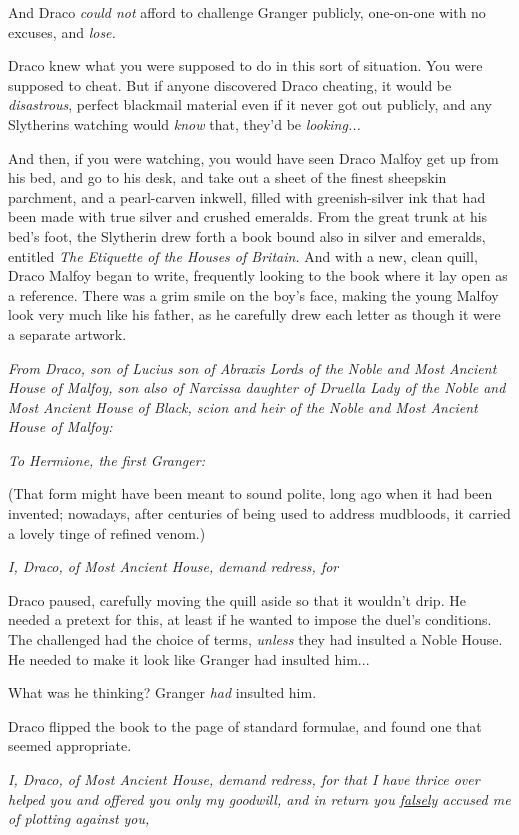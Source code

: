 And Draco \emph{could not} afford to challenge Granger publicly,
one-on-one with no excuses, and \emph{lose.}

Draco knew what you were supposed to do in this sort of
situation. You were supposed to cheat. But if anyone discovered
Draco cheating, it would be \emph{disastrous}, perfect blackmail
material even if it never got out publicly, and any Slytherins
watching would \emph{know} that, they’d be \emph{looking...}

And then, if you were watching, you would have seen Draco Malfoy
get up from his bed, and go to his desk, and take out a sheet of
the finest sheepskin parchment, and a pearl-carven inkwell, filled
with greenish-silver ink that had been made with true silver and
crushed emeralds. From the great trunk at his bed’s foot, the
Slytherin drew forth a book bound also in silver and emeralds,
entitled \emph{The Etiquette of the Houses of Britain.} And with a
new, clean quill, Draco Malfoy began to write, frequently looking
to the book where it lay open as a reference. There was a grim
smile on the boy’s face, making the young Malfoy look very much
like his father, as he carefully drew each letter as though it were
a separate artwork.

\emph{From Draco, son of Lucius son of Abraxis Lords of the Noble
and Most Ancient House of Malfoy, son also of Narcissa daughter of
Druella Lady of the Noble and Most Ancient House of Black, scion
and heir of the Noble and Most Ancient House of Malfoy:}

\emph{To Hermione, the first Granger:}

(That form might have been meant to sound polite, long ago when
it had been invented; nowadays, after centuries of being used to
address mudbloods, it carried a lovely tinge of refined venom.)

\emph{I, Draco, of Most Ancient House, demand redress, for}

Draco paused, carefully moving the quill aside so that it
wouldn’t drip. He needed a pretext for this, at least if he wanted
to impose the duel’s conditions. The challenged had the choice of
terms, \emph{unless} they had insulted a Noble House. He needed to
make it look like Granger had insulted him...

What was he thinking? Granger \emph{had} insulted him.

Draco flipped the book to the page of standard formulae, and
found one that seemed appropriate.

\emph{I, Draco, of Most Ancient House, demand redress, for that I
have thrice over helped you and offered you only my goodwill, and
in return you \underline{falsely} accused me of plotting against
you,}

